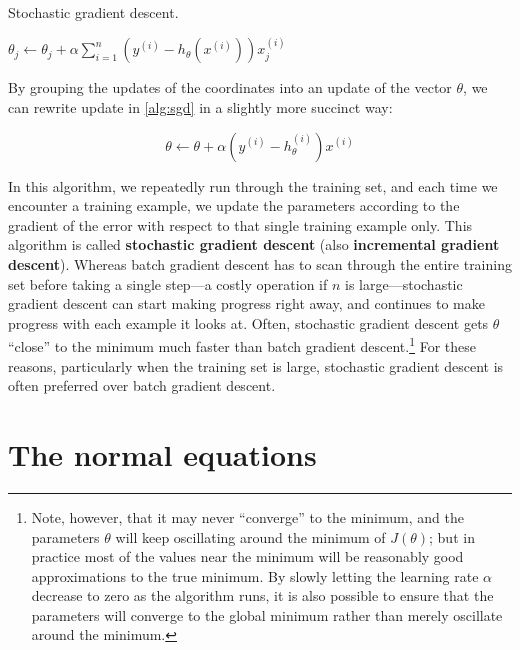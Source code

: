 \begin{algorithm}[ht]
    \caption{Stochastic gradient descent.}
    \label{alg:sgd}
    \begin{algorithmic}
    \Repeat
                \State $\theta_j \leftarrow \theta_j + \alpha \displaystyle\sum\limits_{i=1}^n \left( y^{(i)} - h_\theta(x^{(i)}) \right) x^{(i)}_j$ %
            \EndFor
        \EndFor
    \end{algorithmic}
\end{algorithm}

By grouping the updates of the coordinates into an update of the vector
$\theta$, we can rewrite update in \cref{alg:sgd} in a slightly more succinct way:

\begin{equation}
    \theta \leftarrow \theta + \alpha \left( y^{(i)} - h_\theta^{(i)} \right) x^{(i)}
\end{equation}

In this algorithm, we repeatedly run through the training set, and each
time we encounter a training example, we update the parameters according
to the gradient of the error with respect to that single training example only.
This algorithm is called \textbf{stochastic gradient descent} (also \textbf{incremental
gradient descent}). Whereas batch gradient descent has to scan through
the entire training set before taking a single step---a costly operation if $n$ is
large---stochastic gradient descent can start making progress right away, and
continues to make progress with each example it looks at. Often, stochastic
gradient descent gets $\theta$ ``close'' to the minimum much faster than batch gradient
descent.\footnote{Note, however, that it may never ``converge'' to the minimum,
and the parameters $\theta$ will keep oscillating around the minimum of $J(\theta)$; but
in practice most of the values near the minimum will be reasonably good
approximations to the true minimum. By slowly letting the learning rate $\alpha$ decrease to
zero as the algorithm runs, it is also possible to ensure that the parameters will converge to
the global minimum rather than merely oscillate around the minimum.} %
For these reasons, particularly when the training set is large,
stochastic gradient descent is often preferred over batch gradient descent.


\section{The normal equations}
\label{sec:the_normal_equations}

